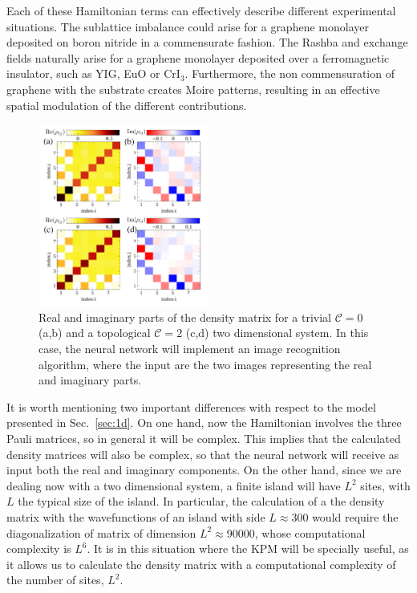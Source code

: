 Each of these Hamiltonian terms can effectively describe different experimental
situations. The sublattice imbalance could arise for a graphene monolayer
deposited on boron nitride in a commensurate
fashion.\cite{wang2016gaps,PhysRevB.88.035448}
The Rashba and exchange fields naturally arise for a graphene monolayer
deposited over a ferromagnetic insulator, such as
YIG,\cite{tang2017approaching,PhysRevLett.114.016603}
EuO\cite{PhysRevB.95.075418} or
CrI$_3$.\cite{huang2017layer,zhang2017strong}
Furthermore, the non commensuration of graphene with the substrate creates Moire
patterns, resulting in an effective spatial modulation of the different
contributions.\cite{PhysRevB.90.075428,PhysRevB.96.085442,wang2016gaps}


\begin{figure}[t!]
\centering
\includegraphics[width=0.5\textwidth]{ann/figures/fig5.pdf}
\caption{
Real and imaginary parts of the density matrix for a trivial $\mathcal{C}=0$ (a,b)
and a topological $\mathcal{C}=2$ (c,d) two dimensional system.
In this case, the neural network will implement an image recognition algorithm,
where the input are the two images representing the real and imaginary parts.
}
\label{fig5}
\end{figure}


It is worth mentioning two important differences with respect to the model
presented in Sec.~\ref{sec:1d}. On one hand, now the Hamiltonian involves the
three Pauli matrices, so in general it will be complex. This implies that the
calculated density matrices will also be complex, so that the neural network
will receive as input both the real and imaginary components.
On the other hand, since we are dealing now with a two dimensional system, a
finite island will have $L^2$ sites, with $L$ the typical size of the island.
In particular, the calculation of a the density matrix with the wavefunctions of
an island with side $L\approx 300$ would require the diagonalization of matrix
of dimension $L^2\approx 90000$, whose computational complexity is $L^6$. It is
in this situation where the KPM will be specially useful, as it allows us to
calculate the density matrix with a computational complexity of the number of
sites, $L^2$.


